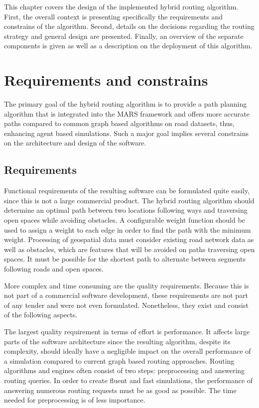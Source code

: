 
This chapter covers the design of the implemented hybrid routing algorithm.
First, the overall context is presenting specifically the requirements and constrains of the algorithm.
Second, details on the decisions regarding the routing strategy and general design are presented.
Finally, an overview of the separate components is given as well as a description on the deployment of this algorithm.

\section{Requirements and constrains}

	The primary goal of the hybrid routing algorithm is to provide a path planning algorithm that is integrated into the MARS framework and offers more accurate paths compared to common graph based algorithms on road datasets, thus, enhancing agent based simulations.
	Such a major goal implies several constrains on the architecture and design of the software.
	
	\subsection{Requirements}
	
		Functional requirements of the resulting software can be formulated quite easily, since this is not a large commercial product.
		The hybrid routing algorithm should determine an optimal path between two locations following ways and traversing open spaces while avoiding obstacles.
		A configurable weight function should be used to assign a weight to each edge in order to find the path with the minimum weight.
		Processing of geospatial data must consider existing road network data as well as obstacles, which are features that will be avoided on paths traversing open spaces.
		It must be possible for the shortest path to alternate between segments following roads and open spaces.
		
		More complex and time consuming are the quality requirements.
		Because this is not part of a commercial software development, these requirements are not part of any tender and were not even formulated.
		Nonetheless, they exist and consist of the following aspects.
	
		The largest quality requirement in terms of effort is performance.
		It affects large parts of the software architecture since the resulting algorithm, despite its complexity, should ideally have a negligible impact on the overall performance of a simulation compared to current graph based routing approaches.
		Routing algorithms and engines often consist of two steps: preprocessing and answering routing queries.
		In order to create fluent and fast simulations, the performance of answering numerous routing requests must be as good as possible.
		The time needed for preprocessing is of less importance.
		
